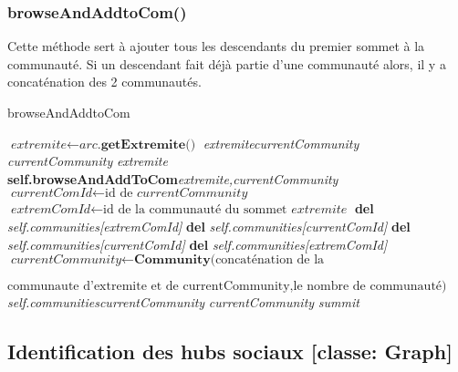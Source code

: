 \documentclass[a4paper]{article}
\begin{document}
\subsubsection{browseAndAddtoCom()}
Cette méthode sert à ajouter tous les descendants du premier sommet à la communauté. Si un descendant fait déjà partie d'une communauté alors, il y a concaténation des 2 communautés. 
\begin{algorithm}[H]
\caption{browseAndAddtoCom}\label{browse}
\begin{algorithmic}[1]
\State $\textit{extremite}\gets \textit{arc}\textbf{.getExtremite()}$
\State {}\textit{extremite}\textit{currentCommunity}
\State {} \textit{currentCommunity} \textit{extremite}
\State \textbf{self.browseAndAddToCom}\text{(}\textit{extremite,currentCommunity}\text{)}
\EndIf
{}
\State $\textit{currentComId}\gets \text{id de }\textit{currentCommunity} $
\State $\textit{extremComId}\gets \text{id de la communauté du sommet }\textit{extremite} $
\State \textbf{del }\textit{self.communities[extremComId]}
\State \textbf{del }\textit{self.communities[currentComId]}
\Else
\State \textbf{del }\textit{self.communities[currentComId]}
\State \textbf{del }\textit{self.communities[extremComId]}
\EndIf
\State $\textit{currentCommunity}\gets \textbf{Community}\text{(concaténation de la }$

$\text{communaute d'extremite et de currentCommunity,le nombre de communauté)}$
\State \textit{self.communities}\textit{currentCommunity}\text{)}
\State {} \textit{currentCommunity} \textit{summit}
\EndFor
\EndIf
\EndFor
\EndProcedure
\end{algorithmic}
\end{algorithm}
\subsection{Identification des hubs sociaux [classe: Graph] }
\end{document}
